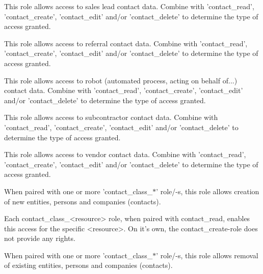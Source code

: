 \begin{description}[style=nextline]
\item [contact\_class\_lead] \htmlspacing 
                         This role allows access to sales lead contact data.
                         Combine with 'contact\_read', 'contact\_create', 'contact\_edit' and/or 'contact\_delete' to determine
                         the type of access granted.
\item [contact\_class\_referral] \htmlspacing 
                         This role allows access to referral contact data.
                         Combine with 'contact\_read', 'contact\_create', 'contact\_edit' and/or 'contact\_delete' to determine
                         the type of access granted.
\item [contact\_class\_robot] \htmlspacing 
                         This role allows access to robot (automated process, acting on behalf of...) contact data.
                         Combine with 'contact\_read', 'contact\_create', 'contact\_edit' and/or 'contact\_delete' to determine
                         the type of access granted.
\item [contact\_class\_sub\_contractor] \htmlspacing 
                         This role allows access to subcontractor contact data.
                         Combine with 'contact\_read', 'contact\_create', 'contact\_edit' and/or 'contact\_delete' to determine
                         the type of access granted.
\item [contact\_class\_vendor] \htmlspacing 
                         This role allows access to vendor contact data.
                         Combine with 'contact\_read', 'contact\_create', 'contact\_edit' and/or 'contact\_delete' to determine
                         the type of access granted.
\item [contact\_create] \htmlspacing 
                         When paired with one or more 'contact\_class\_$\ast$' role/-s, this role allows
                         creation of new entities, persons and companies (contacts).

                         Each contact\_class\_\textless{}resource\textgreater{} role, when paired with contact\_read, enables
                         this access for the specific \textless{}resource\textgreater{}. On it's own, the contact\_create-role
                         does not provide any rights.
\item [contact\_delete] \htmlspacing 
                         When paired with one or more 'contact\_class\_$\ast$' role/-s, this role allows
                         removal of existing entities, persons and companies (contacts).


\end{description}
